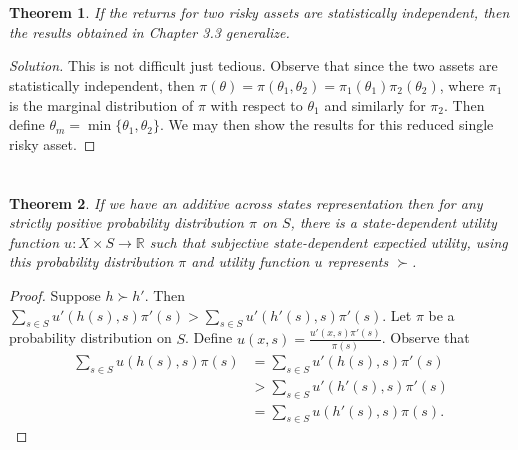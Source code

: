 \documentclass[12pt]{article}
\newtheorem{thm}{Theorem}[section]
\theoremstyle{definition}
\theoremstyle{remark}
\def\RR{\mathbb{R}}
\begin{document}
\section{}
\begin{thm}
  If the returns for two risky assets are statistically independent, then the results obtained in Chapter 3.3 generalize.
\end{thm}
\begin{proof}[Solution]
  This is not difficult just tedious. Observe that since the two assets are statistically independent, then $\pi(\theta) = \pi(\theta_1, \theta_2) = \pi_1(\theta_1)\pi_2(\theta_2)$, where $\pi_1$ is the marginal distribution of $\pi$ with respect to $\theta_1$ and similarly for $\pi_2$.
  Then define $\theta_m = \min \{ \theta_1, \theta_2 \}$. We may then show the results for this reduced single risky asset.
\end{proof}
%
%
\section{}
\begin{thm}
  If we have an \emph{additive across states representation} then for any strictly positive probability distribution $\pi$ on $S$, there is a state-dependent utility function $u: X \times S \rightarrow \RR$ such that subjective state-dependent expectied utility, using this probability distribution $\pi$ and utility function $u$ represents $\succ$.
\end{thm}
\begin{proof}
  Suppose $h \succ h'$. Then $\sum_{s \in S}u'(h(s),s)\pi'(s) > \sum_{s \in S}u'(h'(s),s)\pi'(s)$. Let $\pi$ be a probability distribution on $S$. Define $u(x, s) = \frac{u'(x, s)\pi'(s)}{\pi(s)}$. Observe that
  \begin{align*}
    \sum_{s \in S} u(h(s), s) \pi(s) &= \sum_{s \in S} u'(h(s), s)\pi'(s) \\
    &> \sum_{s \in S} u'(h'(s), s)\pi'(s) \\
    &= \sum_{s \in S} u(h'(s), s) \pi(s).
  \end{align*}
\end{proof}
%
%
\section{}
\end{document}
